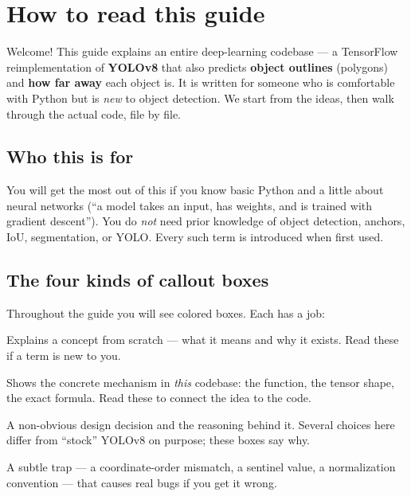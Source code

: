 \chapter*{How to read this guide}

Welcome! This guide explains an entire deep-learning codebase --- a TensorFlow
reimplementation of \textbf{YOLOv8} that also predicts \textbf{object outlines}
(polygons) and \textbf{how far away} each object is. It is written for someone who
is comfortable with Python but is \emph{new} to object detection. We start from the
ideas, then walk through the actual code, file by file.

\section*{Who this is for}
You will get the most out of this if you know basic Python and a little about neural
networks (``a model takes an input, has weights, and is trained with gradient
descent''). You do \emph{not} need prior knowledge of object detection, anchors,
IoU, segmentation, or YOLO. Every such term is introduced when first used.

\section*{The four kinds of callout boxes}
Throughout the guide you will see colored boxes. Each has a job:

\begin{teacher}
Explains a concept from scratch --- what it means and why it exists. Read these if a
term is new to you.
\end{teacher}

\begin{hood}
Shows the concrete mechanism in \emph{this} codebase: the function, the tensor shape,
the exact formula. Read these to connect the idea to the code.
\end{hood}

\begin{why}
A non-obvious design decision and the reasoning behind it. Several choices here differ
from ``stock'' YOLOv8 on purpose; these boxes say why.
\end{why}

\begin{pitfall}
A subtle trap --- a coordinate-order mismatch, a sentinel value, a normalization
convention --- that causes real bugs if you get it wrong.
\end{pitfall}

